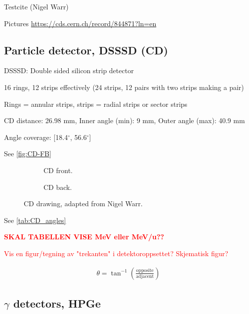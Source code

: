 \documentclass[twoside,english]{uiofysmaster/uiofysmaster}
\let\orgautoref\autoref
\renewcommand{\autoref}
        {\def\equationautorefname{Eq.}%
         \def\figureautorefname{Fig.}%
         \def\subfigureautorefname{Fig.}%
         \def\sectionautorefname{Sec.}%
         \def\subsectionautorefname{Sec.}%
         \def\subsubsectionautorefname{Sec.}%
         \def\Itemautorefname{item}%
         \def\tableautorefname{Tab.}%
         \orgautoref}
\begin{document}
Testcite (Nigel Warr) \cite{NWarr}


Pictures \url{https://cds.cern.ch/record/844871?ln=en}

\subsection{Particle detector, DSSSD (CD)}

DSSSD: Double sided silicon strip detector

16 rings, 12 strips effectively (24 strips, 12 pairs with two strips making a pair)

Rings = annular strips, strips = radial strips or sector strips

CD distance: 26.98 mm, Inner angle (min): 9 mm, Outer angle (max): 40.9 mm

Angle coverage: [18.4$^\circ$, 56.6$^\circ$]

See \autoref{fig:CD-FB}


\begin{figure}
	\centering
	\begin{subfigure}{\textwidth}
		
		\caption{CD front.}
		\label{fig:CD-F}
	\end{subfigure}
	\begin{subfigure}{\textwidth}
		
		\caption{CD back.}
		\label{fig:CD-B}
	\end{subfigure}
	\caption{CD drawing, adapted from Nigel Warr.}
	\label{fig:CD-FB}
\end{figure}




See \autoref{tab:CD_angles}

\begin{table}[ht] 
    \centering 
	
\end{table}

\textcolor{red}{\textbf{SKAL TABELLEN VISE MeV eller MeV/u??}}

\textcolor{red}{Vis en figur/tegning av "trekanten" i detektoroppsettet? Skjematisk figur?} 

\begin{align*}
	\theta = \tan^{-1} \left( \frac{\text{opposite}}{\text{adjacent}} \right)
\end{align*}

\subsection{\texorpdfstring{$\gamma$}{Gamma} detectors, HPGe}
\end{document}
